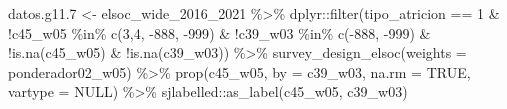 \documentclass[
  12pt,
]{book}
\newenvironment{Shaded}{\begin{snugshade}}{\end{snugshade}}
\newcommand{\AttributeTok}[1]{\textcolor[rgb]{0.77,0.63,0.00}{#1}}
\newcommand{\ConstantTok}[1]{\textcolor[rgb]{0.00,0.00,0.00}{#1}}
\newcommand{\DecValTok}[1]{\textcolor[rgb]{0.00,0.00,0.81}{#1}}
\newcommand{\FloatTok}[1]{\textcolor[rgb]{0.00,0.00,0.81}{#1}}
\newcommand{\FunctionTok}[1]{\textcolor[rgb]{0.00,0.00,0.00}{#1}}
\newcommand{\NormalTok}[1]{#1}
\newcommand{\OtherTok}[1]{\textcolor[rgb]{0.56,0.35,0.01}{#1}}
\newcommand{\SpecialCharTok}[1]{\textcolor[rgb]{0.00,0.00,0.00}{#1}}
\newcommand{\StringTok}[1]{\textcolor[rgb]{0.31,0.60,0.02}{#1}}
\begin{document}
\begin{Shaded}
\begin{Highlighting}[]
\NormalTok{datos.g11}\FloatTok{.7} \OtherTok{\textless{}{-}}\NormalTok{ elsoc\_wide\_2016\_2021 }\SpecialCharTok{\%\textgreater{}\%} 
\NormalTok{  dplyr}\SpecialCharTok{::}\FunctionTok{filter}\NormalTok{(tipo\_atricion }\SpecialCharTok{==} \DecValTok{1} 
                \SpecialCharTok{\&} \SpecialCharTok{!}\NormalTok{c45\_w05 }\SpecialCharTok{\%in\%} \FunctionTok{c}\NormalTok{(}\DecValTok{3}\NormalTok{,}\DecValTok{4}\NormalTok{, }\SpecialCharTok{{-}}\DecValTok{888}\NormalTok{, }\SpecialCharTok{{-}}\DecValTok{999}\NormalTok{)}
                \SpecialCharTok{\&} \SpecialCharTok{!}\NormalTok{c39\_w03 }\SpecialCharTok{\%in\%} \FunctionTok{c}\NormalTok{(}\SpecialCharTok{{-}}\DecValTok{888}\NormalTok{, }\SpecialCharTok{{-}}\DecValTok{999}\NormalTok{) }\SpecialCharTok{\&} \SpecialCharTok{!}\FunctionTok{is.na}\NormalTok{(c45\_w05) }\SpecialCharTok{\&} \SpecialCharTok{!}\FunctionTok{is.na}\NormalTok{(c39\_w03)) }\SpecialCharTok{\%\textgreater{}\%} 
  \FunctionTok{survey\_design\_elsoc}\NormalTok{(}\AttributeTok{weights =} \StringTok{\textquotesingle{}ponderador02\_w05\textquotesingle{}}\NormalTok{) }\SpecialCharTok{\%\textgreater{}\%} 
  \FunctionTok{prop}\NormalTok{(c45\_w05, }\AttributeTok{by =}\NormalTok{ c39\_w03, }\AttributeTok{na.rm =} \ConstantTok{TRUE}\NormalTok{, }\AttributeTok{vartype =} \ConstantTok{NULL}\NormalTok{) }\SpecialCharTok{\%\textgreater{}\%} 
\NormalTok{  sjlabelled}\SpecialCharTok{::}\FunctionTok{as\_label}\NormalTok{(c45\_w05, c39\_w03) }


\end{Highlighting}
\end{Shaded}
\end{document}
